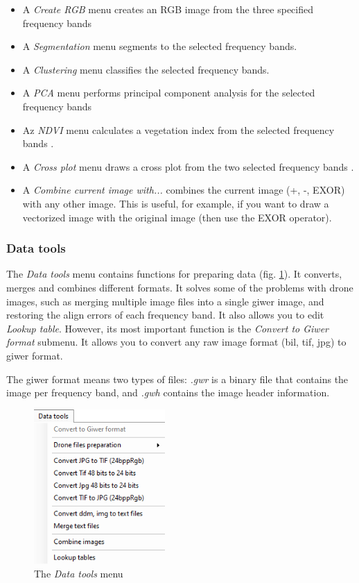 \documentclass[a4paper,12pt]{article}
\begin{document}
\begin{itemize}	
	\item A \textit{Create RGB} menu creates an RGB image from the three specified frequency bands 
	
	\item A \textit{Segmentation} menu segments to the selected frequency bands.
	
	\item A \textit{Clustering} menu classifies the selected frequency bands.
	
	\item A \textit{PCA} menu performs principal component analysis for the selected frequency bands 
	
	\item Az \textit{NDVI} menu calculates a vegetation index from the selected frequency bands .
	
	\item A \textit{Cross plot} menu draws a cross plot from the two selected frequency bands .
	
	\item A \textit{Combine current image with...} combines the current image (+, -, EXOR) with any other image. This is useful, for example, if you want to draw a vectorized image with the original image (then use the EXOR operator). 	
\end{itemize}

\subsubsection{Data tools}

The \textit {Data tools} menu contains functions for preparing data (fig. \ref {fig:datatools_menu}). It converts, merges and combines different formats. It solves some of the problems with drone images, such as merging multiple image files into a single giwer image, and restoring the align errors of each frequency band. It also allows you to edit \textit {Lookup table}. However, its most important function is the \textit {Convert to Giwer format} submenu. It allows you to convert any raw image format (bil, tif, jpg) to giwer format.

The giwer format means two types of files: \textit {.gwr} is a binary file that contains the image per frequency band, and \textit {.gwh} contains the image header information. 

\begin{figure}
	\centering
	\includegraphics[width=5cm]{datatools_menu.png}
	\caption{The \textit{Data tools} menu}
	\label{fig:datatools_menu}
\end{figure}
\end{document}
